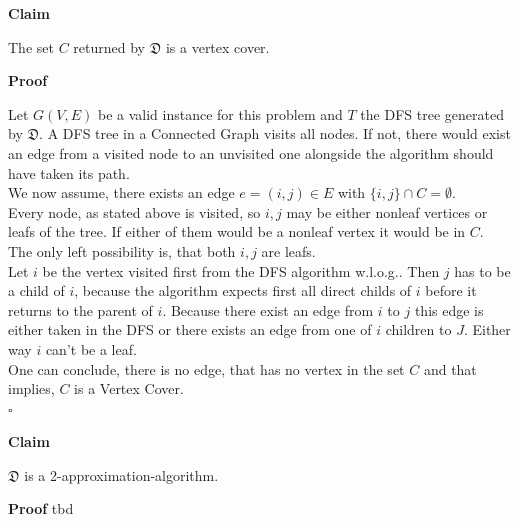 \documentclass[11pt,a4paper,ngerman]{article}
\newcommand{\claim}{\addtocounter{claims}{1} \bfseries Claim \arabic{claims}}
\newcommand{\proof}{\bfseries Proof}
\begin{document}
\pagebreak
\begin{description}
	\item{\claim} The set $C$ returned by $\mathfrak{D}$ is a vertex cover.
	\item{\proof}

Let $G(V,E)$ be a valid instance for this problem and $T$ the DFS tree generated by $\mathfrak{D}$. A DFS tree in a Connected Graph visits all nodes. If not, there would exist an edge from a visited node to an unvisited one alongside the algorithm should have taken its path.\\

We now assume, there exists an edge $e=(i,j)\in E$ with $\{i , j\} \cap C = \emptyset$.\\
Every node, as stated above is visited, so $i,j$ may be either nonleaf vertices or leafs of the tree. If either of them would be a nonleaf vertex it would be in $C$. The only left possibility is, that both $i,j$ are leafs.\\
Let $i$ be the vertex visited first from the DFS algorithm w.l.o.g.. Then $j$ has to be a child of $i$, because the algorithm expects first all direct childs of $i$ before it returns to the parent of $i$. Because there exist an edge from $i$ to $j$ this edge is either taken in the DFS or there exists an edge from one of $i$ children to $J$. Either way $i$ can't be a leaf.\\

One can conclude, there is no edge, that has no vertex in the set $C$ and that implies, $C$ is a Vertex Cover.\\
\mbox{} \hfill $\square$  

	\item{\claim} $\mathfrak{D}$ is a 2-approximation-algorithm.
	\item{\proof}
tbd
\end{description}

\label{LastPage}
\end{document}
